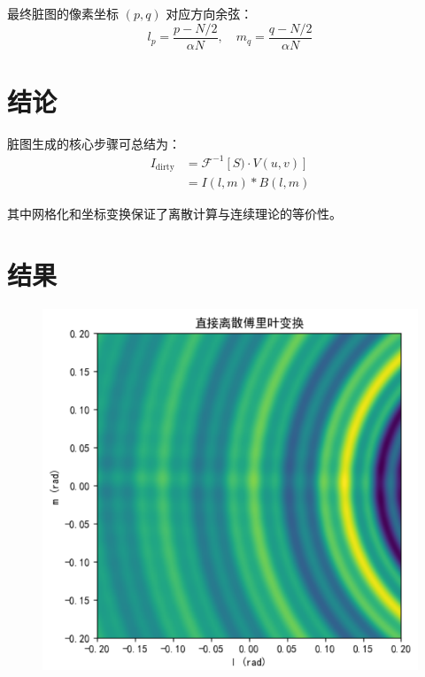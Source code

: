 \documentclass{article}
\begin{document}
最终脏图的像素坐标 $ (p,q) $ 对应方向余弦：
\begin{equation}
l_p = \frac{p - N/2}{\alpha N}, \quad m_q = \frac{q - N/2}{\alpha N}
\end{equation}

\section{结论}
脏图生成的核心步骤可总结为：
\begin{align}
I_{\text{dirty}} &= \mathcal{F}^{-1} \left[ S) \cdot V(u,v) \right] \\
&= I(l,m) \ast B(l,m)
\end{align}

其中网格化和坐标变换保证了离散计算与连续理论的等价性。

\section{结果}
    \begin{figure}[htp]
    \centering
    \includegraphics[width=1\textwidth]{task4/task4_fft_dirty.png}
    \label{fig:fft}
    \end{figure}
    
\end{document}
